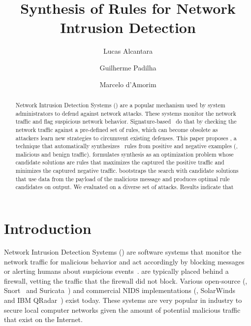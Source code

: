 \documentclass[runningheads]{llncs}
\begin{document}
%
\title{Synthesis of Rules for Network Intrusion Detection}
%
%
\author{Lucas Alcantara \and
Guilherme Padilha \and
Marcelo d'Amorim}
%
%
%
\maketitle              %
%
\begin{abstract}
Network Intrusion Detection Systems (\nids{}) are a popular mechanism
used by system administrators to defend against network attacks. These
systems monitor the network traffic and flag suspicious network
behavior. Signature-based \nids\ do that by checking the network
traffic against a pre-defined set of rules, which can become obsolete
as attackers learn new strategies to circumvent existing defenses.
This paper proposes \tname{}, a technique that automatically
synthesizes \nids\ rules from positive and negative examples (\ie{},
malicious and benign traffic). \tname{} formulates synthesis as an
optimization problem whose candidate solutions are rules that
maximizes the captured the positive traffic and minimizes the captured
negative traffic. \tname{} bootstraps the search with candidate
solutions that use data from the payload of the malicious message and
produces optimal rule candidates on output. We evaluated \tname{} on a
diverse set of attacks. Results indicate that 



\end{abstract}
%
%
%
\section{Introduction}

Network Intrusion Detection Systems (\nids{}) are software systems
that monitor the network traffic for malicious behavior and act
accordingly by blocking messages or alerting humans about suspicious
events~\cite{Mitchell:2014:SID:2597757.2542049}. \nids{} are typically
placed behind a firewall, vetting the traffic that the firewall did
not block. Various open-source (\eg{}, Snort~\cite{snort} and
Suricata~\cite{suricata}) and commercial NIDS implementations (\eg{},
SolarWinds~\cite{solarwinds} and IBM QRadar~\cite{qradar}) exist
today. These systems are very popular in industry to secure local
computer networks given the amount of potential malicious traffic that
exist on the Internet.
\end{document}
